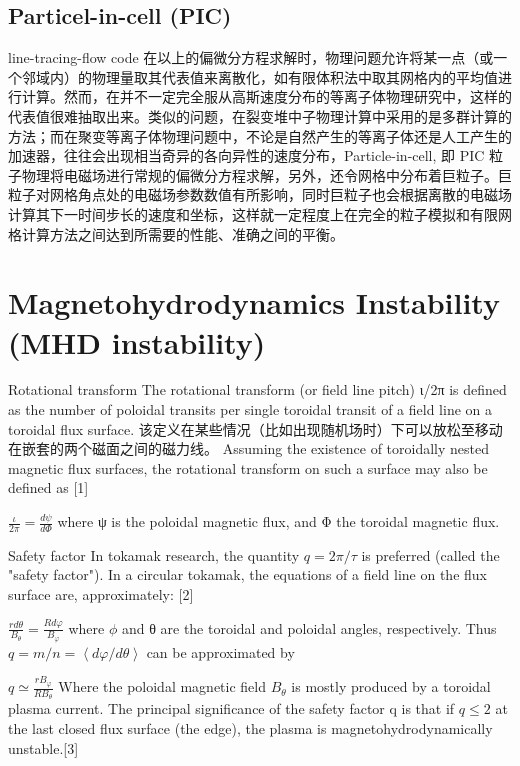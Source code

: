 \subsection{Particel-in-cell (PIC)}
line-tracing-flow code
在以上的偏微分方程求解时，物理问题允许将某一点（或一个邻域内）的物理量取其代表值来离散化，如有限体积法中取其网格内的平均值进行计算。然而，在并不一定完全服从高斯速度分布的等离子体物理研究中，这样的代表值很难抽取出来。类似的问题，在裂变堆中子物理计算中采用的是多群计算的方法；而在聚变等离子体物理问题中，不论是自然产生的等离子体还是人工产生的加速器，往往会出现相当奇异的各向异性的速度分布，Particle-in-cell, 即 PIC 粒子物理将电磁场进行常规的偏微分方程求解，另外，还令网格中分布着巨粒子。巨粒子对网格角点处的电磁场参数数值有所影响，同时巨粒子也会根据离散的电磁场计算其下一时间步长的速度和坐标，这样就一定程度上在完全的粒子模拟和有限网格计算方法之间达到所需要的性能、准确之间的平衡。

\section{Magnetohydrodynamics Instability (MHD instability)}
Rotational transform
The rotational transform (or field line pitch) ι/2π is defined as the number of poloidal transits per single toroidal transit of a field line on a toroidal flux surface. 该定义在某些情况（比如出现随机场时）下可以放松至移动在嵌套的两个磁面之间的磁力线。
Assuming the existence of toroidally nested magnetic flux surfaces, the rotational transform on such a surface may also be defined as [1]

$ \frac{\iota}{2 \pi} = \frac{d \psi}{d \Phi} $
where ψ is the poloidal magnetic flux, and Φ the toroidal magnetic flux.

Safety factor
In tokamak research, the quantity $q = 2\pi/\tau$ is preferred (called the "safety factor"). In a circular tokamak, the equations of a field line on the flux surface are, approximately: [2]

$ \frac{r d\theta}{B_\theta} = \frac{Rd\varphi}{B_\varphi} $
where $ \phi $ and θ are the toroidal and poloidal angles, respectively. Thus $ q = m/n = \left \langle d\varphi /d\theta \right \rangle $ can be approximated by

$ q \simeq \frac{r B_\varphi}{R B_\theta} $
Where the poloidal magnetic field $ {B_\theta} $ is mostly produced by a toroidal plasma current. The principal significance of the safety factor q is that if $ q \leq 2 $ at the last closed flux surface (the edge), the plasma is magnetohydrodynamically unstable.[3]

